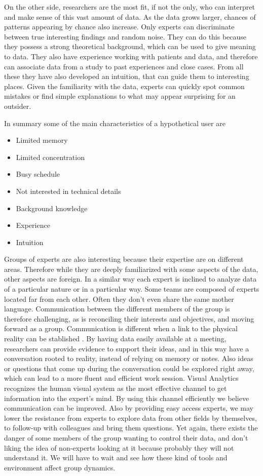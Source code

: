 On the other side, researchers are the most fit, if not the only, who can interpret and make sense of this vast amount of data. As the data grows larger, chances of patterns appearing by chance also increase. Only experts can discriminate between true interesting findings and random noise. They can do this because they possess a strong theoretical background, which can be used to give meaning to data. They also have experience working with patients and data, and therefore can associate data from a study to past experiences and close cases. From all these they have also developed an intuition, that can guide them to interesting places. Given the familiarity with the data, experts can quickly spot common mistakes or find simple explanations to what may appear surprising for an outsider. 

In summary some of the main characteristics of a hypothetical user are

\begin{itemize}
\item Limited memory
\item Limited concentration
\item Busy schedule
\item Not interested in technical details
\item Background knowledge
\item Experience
\item Intuition
\end{itemize}

Groups of experts are also interesting because their expertise are on different areas. Therefore while they are deeply familiarized with some aspects of the data, other aspects are foreign. In a similar way each expert is inclined to analyze data of a particular nature or in a particular way. Some teams are composed of experts located far from each other. Often they don't even share the same mother language. Communication between the different members of the group is therefore challenging, as is reconciling their interests and objectives, and moving forward as a group. Communication is different when a link to the physical reality can be stablished \autocite{rojas_arredondo_dinamica_2010}. By having data easily available at a meeting, researchers can provide evidence to support their ideas, and in this way have a conversation rooted to reality, instead of relying on memory or notes. Also ideas or questions that come up during the conversation could be explored right away, which can lead to a more fluent and efficient work session. Visual Analytics recognizes the human visual system as the most effective channel to get information into the expert's mind. By using this channel efficiently we believe communication can be improved. Also by providing easy access experts, we may lower the resistance from experts to explore data from other fields by themselves, to follow-up with colleagues and bring them questions. Yet again, there exists the danger of some members of the group wanting to control their data, and don't liking the idea of non-experts looking at it because probably they will not understand it. We will have to wait and see how these kind of tools and environment affect group dynamics.


